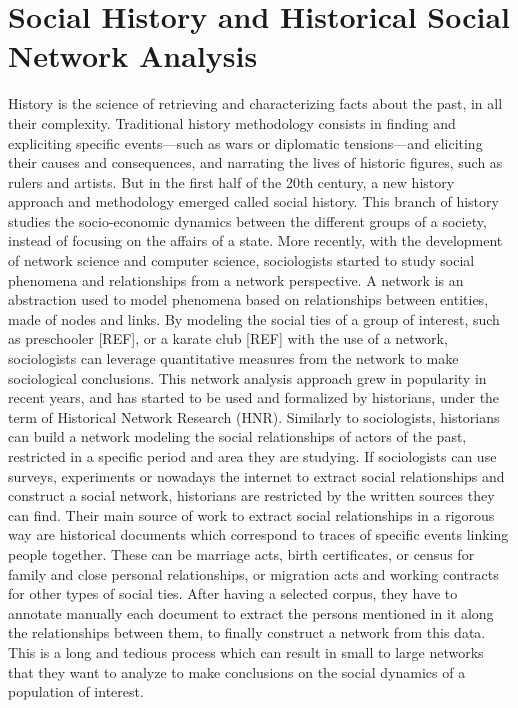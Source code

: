 \section{Social History and Historical Social Network Analysis}

History is the science of retrieving and characterizing facts about the past, in all their complexity. Traditional history methodology consists in finding and expliciting specific events---such as wars or diplomatic tensions---and eliciting their causes and consequences, and narrating the lives of historic figures, such as rulers and artists. But in the first half of the 20th century, a new history approach and methodology emerged called social history. This branch of history studies the socio-economic dynamics between the different groups of a society, instead of focusing on the affairs of a state.
More recently, with the development of network science and computer science, sociologists started to study social phenomena and relationships from a network perspective. A network is an abstraction used to model phenomena based on relationships between entities, made of nodes and links. By modeling the social ties of a group of interest, such as preschooler [REF], or a karate club [REF] with the use of a network, sociologists can leverage quantitative measures from the network to make sociological conclusions.
This network analysis approach grew in popularity in recent years, and has started to be used and formalized by historians, under the term of Historical Network Research (HNR). Similarly to sociologists, historians can build a network modeling the social relationships of actors of the past, restricted in a specific period and area they are studying. If sociologists can use surveys, experiments or nowadays the internet to extract social relationships and construct a social network, historians are restricted by the written sources they can find. Their main source of work to extract social relationships in a rigorous way are historical documents which correspond to traces of specific events linking people together. These can be marriage acts, birth certificates, or census for family and close personal relationships, or migration acts and working contracts for other types of social ties. After having a selected corpus, they have to annotate manually each document to extract the persons mentioned in it along the relationships between them, to finally construct a network from this data. This is a long and tedious process which can result in small to large networks that they want to analyze to make conclusions on the social dynamics of a population of interest.
